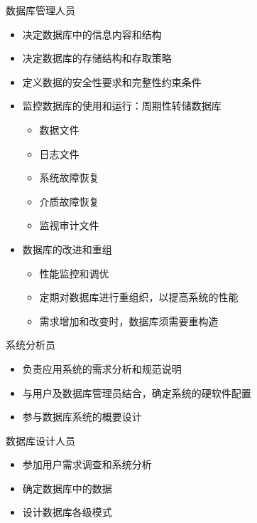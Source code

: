 数据库管理人员
\begin{itemize}
    \item 决定数据库中的信息内容和结构
    \item 决定数据库的存储结构和存取策略
    \item 定义数据的安全性要求和完整性约束条件
    \item 监控数据库的使用和运行：周期性转储数据库
    \vspace{-0.8em}
    \begin{multicols}{2}
        \begin{itemize}
            \item 数据文件
            \item 日志文件
            \item 系统故障恢复
            \item 介质故障恢复
            \item 监视审计文件
        \end{itemize}
    \end{multicols}
    \vspace{-1em}
    \item 数据库的改进和重组
    \begin{itemize}
        \item 性能监控和调优
        \item 定期对数据库进行重组织，以提高系统的性能
        \item 需求增加和改变时，数据库须需要重构造
    \end{itemize}
\end{itemize}

系统分析员
\begin{itemize}
    \item 负责应用系统的需求分析和规范说明
    \item 与用户及数据库管理员结合，确定系统的硬软件配置
    \item 参与数据库系统的概要设计
\end{itemize}

数据库设计人员
\vspace{-0.8em}
\begin{multicols}{2}
    \begin{itemize}
        \item 参加用户需求调查和系统分析
        \item 确定数据库中的数据
        \item 设计数据库各级模式
    \end{itemize}
\end{multicols}
\vspace{-1em}


